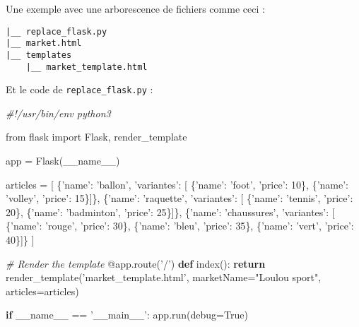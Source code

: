 \documentclass[11pt]{article}
\newenvironment{Shaded}{}{}
\newcommand{\KeywordTok}[1]{\textcolor[rgb]{0.00,0.44,0.13}{\textbf{{#1}}}}
\newcommand{\DecValTok}[1]{\textcolor[rgb]{0.25,0.63,0.44}{{#1}}}
\newcommand{\StringTok}[1]{\textcolor[rgb]{0.25,0.44,0.63}{{#1}}}
\newcommand{\CommentTok}[1]{\textcolor[rgb]{0.38,0.63,0.69}{\textit{{#1}}}}
\newcommand{\NormalTok}[1]{{#1}}
\newcommand{\ImportTok}[1]{{#1}}
\newcommand{\VariableTok}[1]{\textcolor[rgb]{0.10,0.09,0.49}{{#1}}}
\newcommand{\ControlFlowTok}[1]{\textcolor[rgb]{0.00,0.44,0.13}{\textbf{{#1}}}}
\newcommand{\OperatorTok}[1]{\textcolor[rgb]{0.40,0.40,0.40}{{#1}}}
\newcommand{\AttributeTok}[1]{\textcolor[rgb]{0.49,0.56,0.16}{{#1}}}
\begin{document}
Une exemple avec une arborescence de fichiers comme ceci :

\begin{verbatim}
|__ replace_flask.py
|__ market.html
|__ templates
    |__ market_template.html
\end{verbatim}

Et le code de \texttt{replace\_flask.py} :

\begin{Shaded}
\begin{Highlighting}[]
\CommentTok{#!/usr/bin/env python3}

\ImportTok{from}\NormalTok{ flask }\ImportTok{import}\NormalTok{ Flask, render_template}


\NormalTok{app }\OperatorTok{=}\NormalTok{ Flask(}\VariableTok{__name__}\NormalTok{)}


\NormalTok{articles }\OperatorTok{=}\NormalTok{ [}
\NormalTok{    \{}\StringTok{'name'}\NormalTok{: }\StringTok{'ballon'}\NormalTok{, }\StringTok{'variantes'}\NormalTok{: [}
\NormalTok{        \{}\StringTok{'name'}\NormalTok{: }\StringTok{'foot'}\NormalTok{, }\StringTok{'price'}\NormalTok{: }\DecValTok{10}\NormalTok{\}, \{}\StringTok{'name'}\NormalTok{: }\StringTok{'volley'}\NormalTok{, }\StringTok{'price'}\NormalTok{: }\DecValTok{15}\NormalTok{\}]\},}
\NormalTok{    \{}\StringTok{'name'}\NormalTok{: }\StringTok{'raquette'}\NormalTok{, }\StringTok{'variantes'}\NormalTok{: [}
\NormalTok{        \{}\StringTok{'name'}\NormalTok{: }\StringTok{'tennis'}\NormalTok{, }\StringTok{'price'}\NormalTok{: }\DecValTok{20}\NormalTok{\}, \{}\StringTok{'name'}\NormalTok{: }\StringTok{'badminton'}\NormalTok{, }\StringTok{'price'}\NormalTok{: }\DecValTok{25}\NormalTok{\}]\},}
\NormalTok{    \{}\StringTok{'name'}\NormalTok{: }\StringTok{'chaussures'}\NormalTok{, }\StringTok{'variantes'}\NormalTok{: [}
\NormalTok{        \{}\StringTok{'name'}\NormalTok{: }\StringTok{'rouge'}\NormalTok{, }\StringTok{'price'}\NormalTok{: }\DecValTok{30}\NormalTok{\}, \{}\StringTok{'name'}\NormalTok{: }\StringTok{'bleu'}\NormalTok{, }\StringTok{'price'}\NormalTok{: }\DecValTok{35}\NormalTok{\}, \{}\StringTok{'name'}\NormalTok{: }\StringTok{'vert'}\NormalTok{, }\StringTok{'price'}\NormalTok{: }\DecValTok{40}\NormalTok{\}]\}}
\NormalTok{]}

\CommentTok{# Render the template}
\AttributeTok{@app.route}\NormalTok{(}\StringTok{'/'}\NormalTok{)}
\KeywordTok{def}\NormalTok{ index():}
    \ControlFlowTok{return}\NormalTok{ render_template(}\StringTok{'market_template.html'}\NormalTok{, marketName}\OperatorTok{=}\StringTok{"Loulou sport"}\NormalTok{, articles}\OperatorTok{=}\NormalTok{articles)}


\ControlFlowTok{if} \VariableTok{__name__} \OperatorTok{==} \StringTok{'__main__'}\NormalTok{:}
\NormalTok{    app.run(debug}\OperatorTok{=}\VariableTok{True}\NormalTok{)}
\end{Highlighting}
\end{Shaded}
\end{document}
